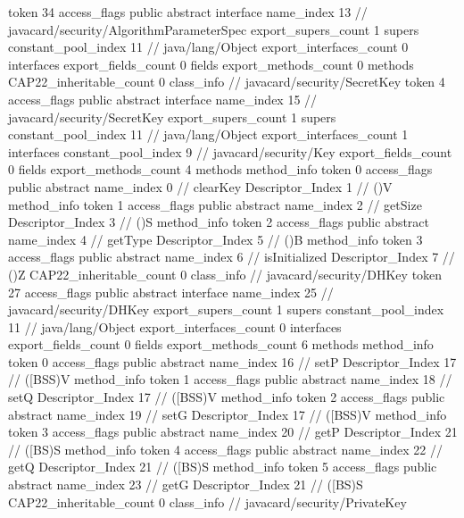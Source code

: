 {{{			token	34
			access_flags	public abstract interface
			name_index	13		// javacard/security/AlgorithmParameterSpec
			export_supers_count	1
			supers {
				constant_pool_index	11		// java/lang/Object
			}
			export_interfaces_count	0
			interfaces {
			}
			export_fields_count	0
			fields {
			}
			export_methods_count	0
			methods {
			}
			CAP22_inheritable_count	0
		}
		class_info {		// javacard/security/SecretKey
			token	4
			access_flags	public abstract interface
			name_index	15		// javacard/security/SecretKey
			export_supers_count	1
			supers {
				constant_pool_index	11		// java/lang/Object
			}
			export_interfaces_count	1
			interfaces {
				constant_pool_index	9		// javacard/security/Key
			}
			export_fields_count	0
			fields {
			}
			export_methods_count	4
			methods {
				method_info {
					token	0
					access_flags	public abstract
					name_index	0		// clearKey
					Descriptor_Index	1		// ()V
				}
				method_info {
					token	1
					access_flags	public abstract
					name_index	2		// getSize
					Descriptor_Index	3		// ()S
				}
				method_info {
					token	2
					access_flags	public abstract
					name_index	4		// getType
					Descriptor_Index	5		// ()B
				}
				method_info {
					token	3
					access_flags	public abstract
					name_index	6		// isInitialized
					Descriptor_Index	7		// ()Z
				}
			}
			CAP22_inheritable_count	0
		}
		class_info {		// javacard/security/DHKey
			token	27
			access_flags	public abstract interface
			name_index	25		// javacard/security/DHKey
			export_supers_count	1
			supers {
				constant_pool_index	11		// java/lang/Object
			}
			export_interfaces_count	0
			interfaces {
			}
			export_fields_count	0
			fields {
			}
			export_methods_count	6
			methods {
				method_info {
					token	0
					access_flags	public abstract
					name_index	16		// setP
					Descriptor_Index	17		// ([BSS)V
				}
				method_info {
					token	1
					access_flags	public abstract
					name_index	18		// setQ
					Descriptor_Index	17		// ([BSS)V
				}
				method_info {
					token	2
					access_flags	public abstract
					name_index	19		// setG
					Descriptor_Index	17		// ([BSS)V
				}
				method_info {
					token	3
					access_flags	public abstract
					name_index	20		// getP
					Descriptor_Index	21		// ([BS)S
				}
				method_info {
					token	4
					access_flags	public abstract
					name_index	22		// getQ
					Descriptor_Index	21		// ([BS)S
				}
				method_info {
					token	5
					access_flags	public abstract
					name_index	23		// getG
					Descriptor_Index	21		// ([BS)S
				}
			}
			CAP22_inheritable_count	0
		}
		class_info {		// javacard/security/PrivateKey
}}}
